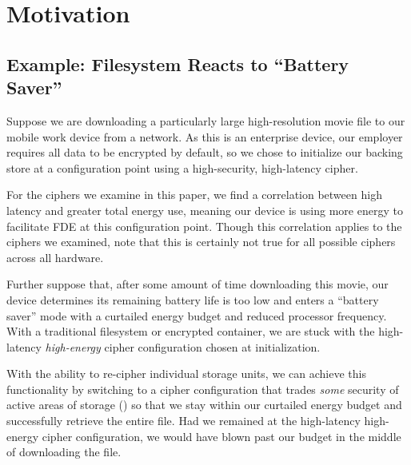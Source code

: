 \section{Motivation}\label{sec:motivation}

\subsection{Example: Filesystem Reacts to ``Battery Saver''}


Suppose we are downloading a particularly large high-resolution movie file to
our mobile work device from a network. As this is an enterprise device, our
employer requires all data to be encrypted by default, so we chose to initialize
our backing store at a configuration point using a high-security, high-latency
cipher.

For the ciphers we examine in this paper, we find a correlation between high
latency and greater total energy use, meaning our device is using more energy to
facilitate FDE at this configuration point. Though this correlation applies to
the ciphers we examined, note that this is certainly not true for all possible
ciphers across all hardware.

Further suppose that, after some amount of time downloading this movie, our
device determines its remaining battery life is too low and enters a ``battery
saver'' mode with a curtailed energy budget and reduced processor frequency.
With a traditional filesystem or encrypted container, we are stuck with the
high-latency \emph{high-energy} cipher configuration chosen at initialization.

With the ability to re-cipher individual storage units, we can achieve this
functionality by switching to a cipher configuration that trades \emph{some}
security of active areas of storage () so that we stay within our
curtailed energy budget and successfully retrieve the entire file. Had we
remained at the high-latency high-energy cipher configuration, we would have
blown past our budget in the middle of downloading the file.

